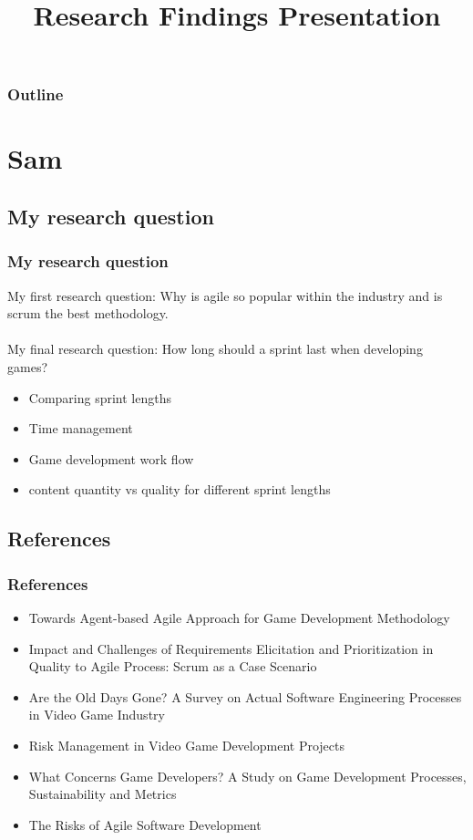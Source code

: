 \documentclass{beamer}
\title{Research Findings Presentation}
\begin{document}
\begin{frame}
\titlepage
\end{frame}

\begin{frame}
\frametitle{Outline}
\tableofcontents
\end{frame}

\section{Sam}
\subsection{My research question}
\begin{frame}
\frametitle{My research question}
My first research question: Why is agile so popular within the industry and is scrum the best methodology.
\\~\\
My final research question: How long should a sprint last when developing games?\\
\begin{itemize}
\item Comparing sprint lengths
\item Time management
\item Game development work flow
\item content quantity vs quality for different sprint lengths
\end{itemize}
\end{frame}

\subsection{References}
\begin{frame}
\frametitle{References}
\begin{itemize}
\item Towards Agent-based Agile Approach for Game
Development Methodology 
\item Impact and Challenges of Requirements Elicitation and Prioritization in Quality to Agile Process: Scrum as
a Case Scenario
\item Are the Old Days Gone? A Survey on Actual Software
Engineering Processes in Video Game Industry
\item Risk Management in Video Game Development Projects
\item What Concerns Game Developers?
A Study on Game Development Processes, Sustainability and Metrics
\item The Risks of Agile Software Development
\end{itemize}
\end{frame}
\end{document}

